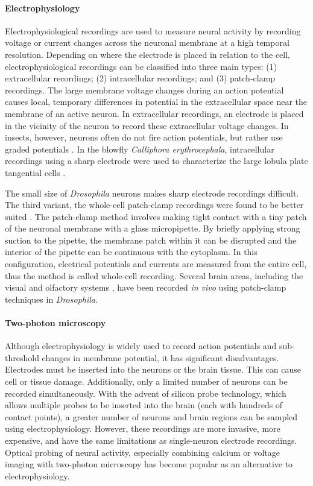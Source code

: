 \paragraph{Electrophysiology}
Electrophysiological recordings are used to measure neural activity by recording voltage or current changes across the neuronal membrane at a high temporal resolution. Depending on where the electrode is placed in relation to the cell, electrophysiological recordings can be classified into three main types: (1) extracellular recordings; (2) intracellular recordings; and (3) patch-clamp recordings. The large membrane voltage changes during an action potential causes local, temporary differences in potential in the extracellular space near the membrane of an active neuron. In extracellular recordings, an electrode is placed in the vicinity of the neuron to record these extracellular voltage changes. In insects, however, neurons often do not fire action potentials, but rather use graded potentials \parencite{Haag1998}. In the blowfly \textit{Calliphora erythrocephala}, intracellular recordings using a sharp electrode were used to characterize the large lobula plate tangential cells \parencite{Hausen1976, Krapp1998}.

The small size of \textit{Drosophila} neurons makes sharp electrode recordings difficult. The third variant, the whole-cell patch-clamp recordings were found to be better suited \parencite{Hamill1981}. The patch-clamp method involves making tight contact with a tiny patch of the neuronal membrane with a glass micropipette. By briefly applying strong suction to the pipette, the membrane patch within it can be disrupted and the interior of the pipette can be continuous with the cytoplasm. In this configuration, electrical potentials and currents are measured from the entire cell, thus the method is called whole-cell recording. Several brain areas, including the visual \parencite{Groschner2022, Gruntman2018, Joesch2008, Behnia2014} and olfactory systems \parencite{Wilson2004}, have been recorded \textit{in vivo} using patch-clamp techniques in \textit{Drosophila}.
\paragraph{Two-photon microscopy}
Although electrophysiology is widely used to record action potentials and sub-threshold changes in membrane potential, it has significant disadvantages. Electrodes must be inserted into the neurons or the brain tissue. This can cause cell or tissue damage. Additionally, only a limited number of neurons can be recorded simultaneously. With the advent of silicon probe technology, which allows multiple probes to be inserted into the brain (each with hundreds of contact points), a greater number of neurons and brain regions can be sampled using electrophysiology. However, these recordings are more invasive, more expensive, and have the same limitations as single-neuron electrode recordings. Optical probing of neural activity, especially combining calcium or voltage imaging with two-photon microscopy has become popular as an alternative to electrophysiology. 

